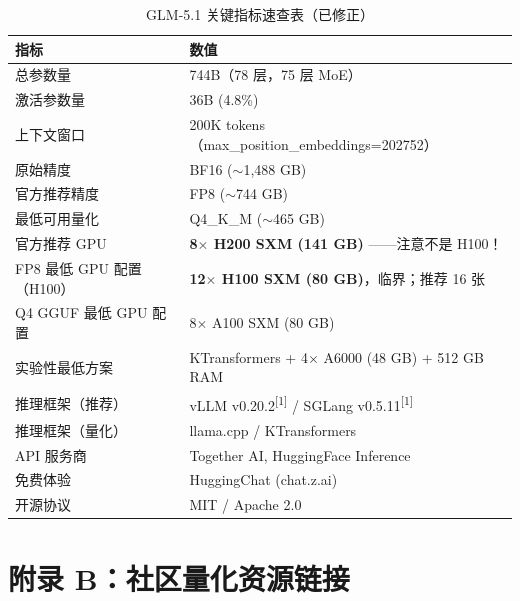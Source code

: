 \documentclass[UTF8,a4paper,10pt,oneside]{ctexart}
\begin{document}
\begin{table}[htbp]
\centering
\caption{GLM-5.1 关键指标速查表（已修正）}
\begin{tabular}{p{3.8cm}p{8cm}}
\hline
\textbf{指标} & \textbf{数值} \\
\hline
总参数量 & 744B（78 层，75 层 MoE）\\
激活参数量 & 36B (4.8\%) \\
上下文窗口 & 200K tokens（max\_position\_embeddings=202752）\\
原始精度 & BF16 ($\sim$1,488 GB) \\
官方推荐精度 & FP8 ($\sim$744 GB) \\
最低可用量化 & Q4\_K\_M ($\sim$465 GB) \\
官方推荐 GPU & \textbf{8$\times$ H200 SXM (141 GB)} ——注意不是 H100！\\
FP8 最低 GPU 配置（H100）& \textbf{12$\times$ H100 SXM (80 GB)}，临界；推荐 16 张 \\
Q4 GGUF 最低 GPU 配置 & 8$\times$ A100 SXM (80 GB) \\
实验性最低方案 & KTransformers + 4$\times$ A6000 (48 GB) + 512 GB RAM \\
推理框架（推荐） & vLLM v0.20.2\textsuperscript{[1]} / SGLang v0.5.11\textsuperscript{[1]} \\
推理框架（量化） & llama.cpp / KTransformers \\
API 服务商 & Together AI, HuggingFace Inference \\
免费体验 & HuggingChat (chat.z.ai) \\
开源协议 & MIT / Apache 2.0 \\
\hline
\end{tabular}
\end{table}

\section*{附录 B：社区量化资源链接}
\end{document}
